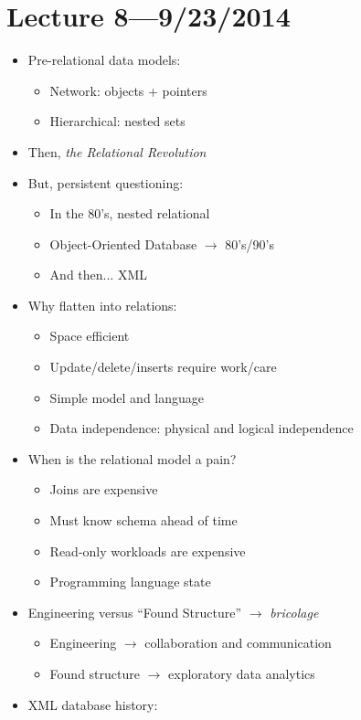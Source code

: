 \documentclass[10pt]{article}
\begin{document}
\section{Lecture 8---9/23/2014}

\begin{itemize}
\item Pre-relational data models:
\begin{itemize}
\item Network: objects + pointers
\item Hierarchical: nested sets
\end{itemize}
\item Then, \emph{the Relational Revolution}
\item But, persistent questioning:
\begin{itemize}
\item In the 80's, nested relational
\item Object-Oriented Database $\rightarrow$ 80's/90's
\item And then... XML
\end{itemize}
\item Why flatten into relations:
\begin{itemize}
\item Space efficient
\item Update/delete/inserts require work/care
\item Simple model and language
\item Data independence: physical and logical independence
\end{itemize}
\item When is the relational model a pain?
\begin{itemize}
\item Joins are expensive
\item Must know schema ahead of time
\item Read-only workloads are expensive
\item Programming language state
\end{itemize}
\item Engineering versus ``Found Structure'' $\rightarrow$ \emph{bricolage}
\begin{itemize}
\item Engineering $\rightarrow$ collaboration and communication
\item Found structure $\rightarrow$ exploratory data analytics
\end{itemize}
\item XML database history:

\end{itemize}
\end{document}
